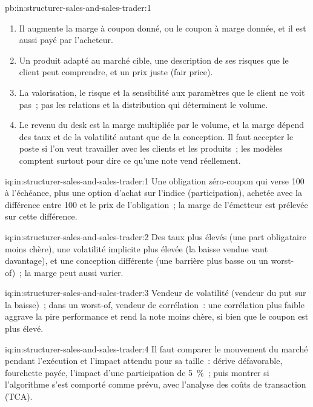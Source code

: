 \begin{solution}{pb:in:structurer-sales-and-sales-trader:1}
\begin{enumerate}
\item Il augmente la marge à coupon donné, ou le coupon à marge donnée, et il est aussi payé par l'acheteur.
\item Un produit adapté au marché cible, une description de ses risques que le client peut comprendre, et un prix juste (fair price).
\item La valorisation, le risque et la sensibilité aux paramètres que le client ne voit pas~; pas les relations et la distribution qui
déterminent le volume.
\item Le revenu du desk est la marge multipliée par le volume, et la marge dépend des taux et de la volatilité autant que de la conception.
Il faut accepter le poste si l'on veut travailler avec les clients et les produits~; les modèles comptent surtout pour dire
ce qu'une note vend réellement.
\end{enumerate}
\end{solution}

\begin{solution}{iq:in:structurer-sales-and-sales-trader:1}
Une obligation zéro-coupon qui verse 100 à l'échéance, plus une option d'achat sur l'indice (participation), achetée avec la différence
entre 100 et le prix de l'obligation~; la marge de l'émetteur est prélevée sur cette différence.
\end{solution}

\begin{solution}{iq:in:structurer-sales-and-sales-trader:2}
Des taux plus élevés (une part obligataire moins chère), une volatilité implicite plus élevée (la baisse vendue vaut davantage), et une conception différente
(une barrière plus basse ou un worst-of)~; la marge peut aussi varier.
\end{solution}

\begin{solution}{iq:in:structurer-sales-and-sales-trader:3}
Vendeur de volatilité (vendeur du put sur la baisse)~; dans un worst-of, vendeur de corrélation~: une corrélation plus faible aggrave la pire performance
et rend la note moins chère, si bien que le coupon est plus élevé.
\end{solution}

\begin{solution}{iq:in:structurer-sales-and-sales-trader:4}
Il faut comparer le mouvement du marché pendant l'exécution et l'impact attendu pour sa taille~: dérive défavorable, fourchette payée,
l'impact d'une participation de 5~\%~; puis montrer si l'algorithme s'est comporté comme prévu, avec l'analyse des coûts de transaction (TCA).
\end{solution}

